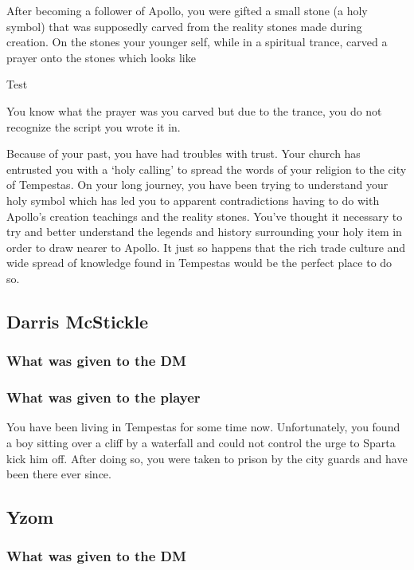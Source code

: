 After becoming a follower of Apollo, you were gifted a small stone (a holy symbol) that was supposedly carved from the reality stones made during creation. On the stones your younger self, while in a spiritual trance, carved a prayer onto the stones which looks like

\begin{center}
	{\Large {} 
	Test
	}
\end{center}

You know what the prayer was you carved but due to the trance, you do not recognize the script you wrote it in.

Because of your past, you have had troubles with trust. Your church has entrusted you with a `holy calling' to spread the words of your religion to the city of Tempestas. On your long journey, you have been trying to understand your holy symbol which has led you to apparent contradictions having to do with Apollo's creation teachings and the reality stones. You've thought it necessary to try and better understand the legends and history surrounding your holy item in order to draw nearer to Apollo. It just so happens that the rich trade culture and wide spread of knowledge found in Tempestas would be the perfect place to do so.

\subsection{Darris McStickle}

\subsubsection{What was given to the DM}

\subsubsection{What was given to the player}

You have been living in Tempestas for some time now. Unfortunately, you found a boy sitting over a cliff by a waterfall and could not control the urge to Sparta kick him off. After doing so, you were taken to prison by the city guards and have been there ever since.

\subsection{Yzom}

\subsubsection{What was given to the DM}

